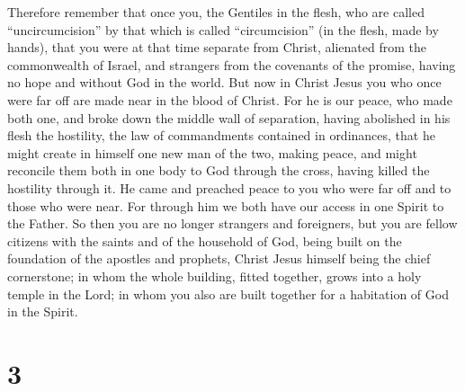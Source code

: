  Therefore remember that once you, the Gentiles in the
flesh, who are called ``uncircumcision'' by that which is called
``circumcision'' (in the flesh, made by hands),  that you
were at that time separate from Christ, alienated from the commonwealth
of Israel, and strangers from the covenants of the promise, having no
hope and without God in the world.  But now in Christ Jesus
you who once were far off are made near in the blood of Christ.
 For he is our peace, who made both one, and broke down the
middle wall of separation,  having abolished in his flesh
the hostility, the law of commandments contained in ordinances, that he
might create in himself one new man of the two, making peace,
 and might reconcile them both in one body to God through
the cross, having killed the hostility through it.  He came
and preached peace to you who were far off and to those who were near.
 For through him we both have our access in one Spirit to
the Father.  So then you are no longer strangers and
foreigners, but you are fellow citizens with the saints and of the
household of God,  being built on the foundation of the
apostles and prophets, Christ Jesus himself being the chief cornerstone;
 in whom the whole building, fitted together, grows into a
holy temple in the Lord;  in whom you also are built
together for a habitation of God in the Spirit.

\hypertarget{section-2}{%
\section{3}\label{section-2}}


